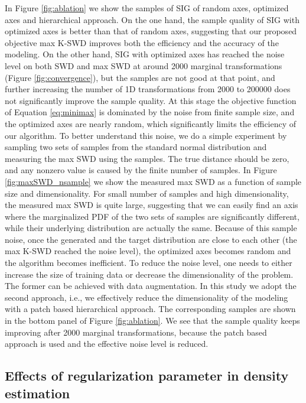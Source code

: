 \documentclass{article}
\begin{document}
In Figure \ref{fig:ablation} we show the samples of SIG of random axes, optimized axes and hierarchical approach. On the one hand, the sample quality of SIG with optimized axes is better than that of random axes, suggesting that our proposed objective max K-SWD improves both the efficiency and the accuracy of the modeling. On the other hand, SIG with optimized axes has reached the noise level on both SWD and max SWD at around 2000 marginal transformations (Figure \ref{fig:convergence}), but the samples are not good at that point, and further increasing the number of 1D transformations from 2000 to 200000 does not significantly improve the sample quality. At this stage the objective function of Equation \ref{eq:minimax} is dominated by the noise from finite sample size, and the optimized axes are nearly random, which significantly limits the efficiency of our algorithm. To better understand this noise, we do a simple experiment by sampling two sets of samples from the standard normal distribution  and measuring the max SWD using the samples. The true distance should be zero, and any nonzero value is caused by the finite number of samples. In Figure \ref{fig:maxSWD_nsample} we show the measured max SWD as a function of sample size and dimensionality. For small number of samples and high dimensionality, the measured max SWD is quite large, suggesting that we can easily find an axis where the marginalized PDF of the two sets of samples are significantly different, while their underlying distribution are actually the same. Because of this sample noise, once the generated and the target distribution are close to each other (the max K-SWD reached the noise level), the optimized axes becomes random and the algorithm becomes inefficient. To reduce the noise level, one needs to either increase the size of training data or decrease the dimensionality of the problem. The former can be achieved with data augmentation. In this study we adopt the second approach, i.e., we effectively reduce the dimensionality of the modeling with a patch based hierarchical approach. The corresponding samples are shown in the bottom panel of Figure \ref{fig:ablation}. We see that the sample quality keeps improving after 2000 marginal transformations, because the patch based approach is used and the effective noise level is reduced.

\subsection{Effects of regularization parameter  in density estimation}
\end{document}

